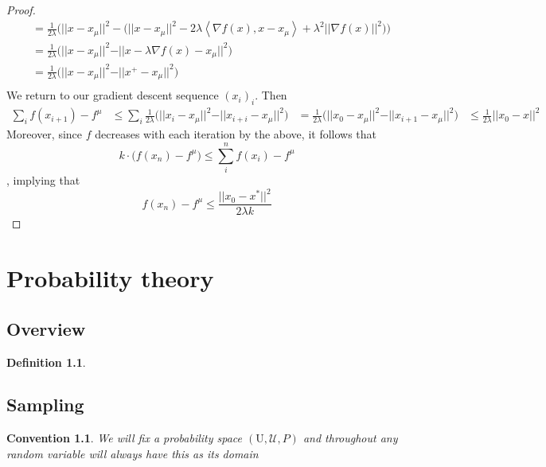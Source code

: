 \documentclass{book}
\theoremstyle{plain}
\newtheorem{convention}[corollary]{Convention}
\theoremstyle{definition}
\newtheorem{definition}[corollary]{Definition}
\newcommand{\bl}[2]{\left\langle #1,#2\right\rangle}
\newcommand{\norm}[1]{\vert \vert #1 \vert \vert}
\renewcommand{\r}[1]{\mathcal{#1}}
\renewcommand{\r}[1]{\mathcal{#1}}
\begin{document}
\begin{proof}
\begin{align*}
 & = \frac{1}{2\lambda}\bigg(\vert \vert x - x_\mu\vert \vert^2 -\big(\vert \vert x-x_\mu \vert \vert^2 -2\lambda \bl{\nabla f(x)}{x -x_\mu}+\lambda^2\vert \vert \nabla f(x)\vert \vert^2 \big)\bigg)\\
 &=\frac{1}{2\lambda}\bigg(\vert \vert x-x_\mu\vert \vert^2-\vert \vert x-\lambda \nabla f(x)-x_\mu \vert \vert^2 \bigg)\\
 &=\frac{1}{2\lambda}\bigg(\vert \vert x-x_\mu\vert \vert^2-\vert \vert x^+-x_\mu \vert \vert^2 \bigg)\\
 \end{align*}
We return to our gradient descent sequence $(x_i)_i$. Then
\begin{align*}
\sum_i f(x_{i+1})-f^\mu	& \le \sum_i \frac{1}{2\lambda}\bigg(\vert \vert x_i-x_\mu\vert \vert^2-\vert \vert x_{i+i}-x_\mu \vert \vert^2 \bigg)
&= \frac{1}{2\lambda}\bigg(\vert \vert x_0-x_\mu\vert \vert^2-\vert \vert x_{i+1}-x_\mu \vert \vert^2 \bigg)
&\le \frac{1}{2\lambda}\vert \vert x_0-x\vert\vert^2
\end{align*}
Moreover, since $f$ decreases with each iteration by the above, it follows that 
\[k\cdot \big(f(x_n)-f^\mu\big)\le \sum^n_i f(x_i)-f^\mu
\], implying that
\[
f(x_{n})-f^\mu\le \frac{\norm{x_0-x^*}^2}{2\lambda k}
\]
\end{proof}


\chapter{Probability theory}
\section{Overview}
\begin{definition}\label{def:prob_probspace}

\end{definition}


\section{Sampling}
\begin{convention}\label{conv:prob_univ}
We will fix a probability space $(\textrm{U}, \r{U},P)$ and throughout any random variable will always have this as its domain
\end{convention}
\end{document}
